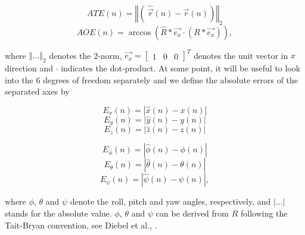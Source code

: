 \begin{equation}
       ATE \left( n \right) = \left\Vert\left(\ \hat{\vec{r}} \left( n \right) - \vec{r} \left( n \right) \right) \right\Vert_2
\end{equation}
\begin{equation}
       AOE \left( n \right) = \arccos \left( \hat{R} *\vec{e_{x}} \cdot\left( R *\vec{e_{x}} \right)\right) ,
\end{equation}

where $\left\Vert \dots \right\Vert_2$ denotes the 2-norm, $\vec{e_{x}} = \left[ \begin{array}{ccc} 1& 0& 0 \end{array} \right]^T$ denotes the unit vector in $x$ direction and $\cdot$ indicates the dot-product. At some point, it will be useful to look into the 6 degrees of freedom separately and we define the absolute errors of the separated axes by

\begin{equation}
       E_{x} \left( n \right) = \left| \hat{x} \left( n \right) - x \left( n \right) \right| 
\end{equation}
\begin{equation}
       E_{y} \left( n \right) = \left| \hat{y} \left( n \right) - y \left( n \right) \right|
\end{equation}
\begin{equation}
       E_{z} \left( n \right) = \left| \hat{z} \left( n \right) - z \left( n \right) \right|
\end{equation}

\begin{equation}
	E_{\phi} \left( n \right) = \left| \hat{\phi} \left( n \right) - \phi \left( n \right)\right|
\end{equation}
\begin{equation}
	E_{\theta} \left( n \right) = \left| \hat{\theta} \left( n \right) - \theta \left( n \right)\right|
\end{equation}
\begin{equation}
	E_{\psi} \left( n \right) = \left| \hat{\psi} \left( n \right) - \psi \left( n \right)\right| ,
\end{equation}

where $\phi$, $\theta$ and $\psi$ denote the roll, pitch and yaw angles, respectively, and $\left| \dots \right|$ stands for the absolute value. $\phi$, $\theta$ and $\psi$ can be derived from $R$ following the Tait-Bryan convention, see Diebel et al., \cite{diebel2006representing}.


